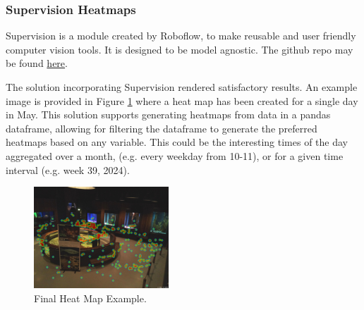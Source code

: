 \subsubsection{Supervision Heatmaps}
Supervision is a module created by Roboflow, to make reusable and user friendly computer vision tools. It is designed to be model agnostic. The github repo may be found \href{https://github.com/roboflow/supervision}{here}.

The solution incorporating Supervision rendered satisfactory results. An example image is provided in Figure \ref{fig:heatmap_final_example} where a heat map has been created for a single day in May. This solution supports generating heatmaps from data in a pandas dataframe, allowing for filtering the dataframe to generate the preferred heatmaps based on any variable. This could be the interesting times of the day aggregated over a month, (e.g. every weekday from 10-11), or for a given time interval (e.g. week 39, 2024).

\begin{figure}[H]
    \centering
    \includegraphics[width=0.45\textwidth]{Images/Analytics/heatmap_day_10052024.jpg}
    \caption[Final Heat Map Example]{Final Heat Map Example.}
    \label{fig:heatmap_final_example}
\end{figure}
